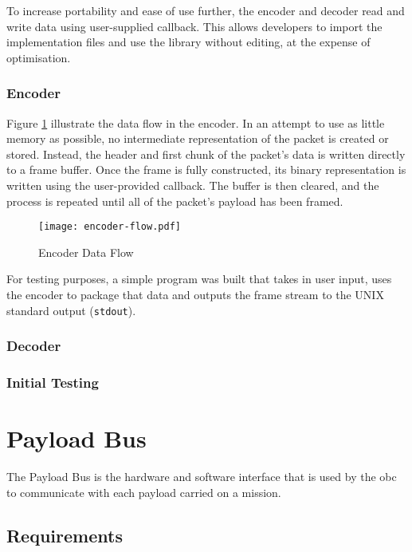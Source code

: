 To increase portability and ease of use further, the encoder and decoder read
and write data using user-supplied callback. This allows developers to import
the implementation files and use the library without editing, at the expense of
optimisation.

\subsubsection{Encoder}

Figure \ref{fig:encoder-flow} illustrate the data flow in the encoder.
In an attempt to use as little memory as possible, no intermediate
representation of the packet is created or stored. Instead, the header and
first chunk of the packet's data is written directly to a frame buffer. Once
the frame is fully constructed, its binary representation is written using the
user-provided callback. The buffer is then cleared, and the process is repeated
until all of the packet's payload has been framed. 

\begin{figure}[H]
\texttt{[image: encoder-flow.pdf]}
\centering
\caption{Encoder Data Flow}
\label{fig:encoder-flow}
\end{figure}

For testing purposes, a simple program was built that takes in user input,
uses the encoder to package that data and outputs the frame stream to the
UNIX standard output (\texttt{stdout}).


\subsubsection{Decoder}

\subsubsection{Initial Testing}

\section{Payload Bus}
\label{sec:payload-bus}

The Payload Bus is the hardware and software interface that is used by the
\acrfull{obc} to communicate with each payload carried on a mission.

\subsection{Requirements}

